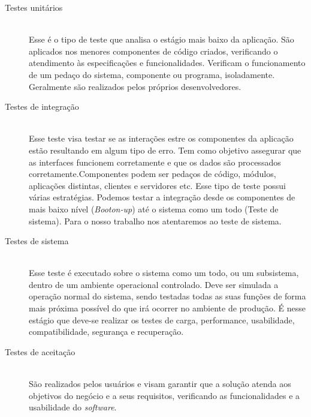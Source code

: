 \begin{description}
\item[Testes unitários] \hfill \\

Esse é o tipo de teste que analisa o estágio mais baixo da aplicação. São aplicados nos menores componentes de código criados, verificando o atendimento às especificações e funcionalidades. Verificam o funcionamento de um pedaço do sistema, componente ou programa,  isoladamente. Geralmente são realizados pelos próprios desenvolvedores.

\item[Testes de integração] \hfill \\

Esse teste visa testar se as interações estre os componentes da aplicação estão resultando em algum tipo de erro. Tem como objetivo assegurar que as interfaces funcionem corretamente e que os dados são processados corretamente.Componentes podem ser pedaços de código, módulos, aplicações distintas, clientes e servidores etc. Esse tipo de teste possui várias estratégias. Podemos testar a integração desde os componentes de mais baixo nível (\textit{Booton-up})  até o sistema como um todo (Teste de sistema). Para o nosso trabalho nos atentaremos ao teste de sistema.

\item[Testes de sistema] \hfill \\

Esse teste é executado sobre o sistema como um todo, ou um subsistema, dentro de um ambiente operacional controlado. Deve ser simulada a operação normal do sistema, sendo testadas todas as suas funções de forma mais próxima possível do que irá ocorrer no ambiente de produção. É nesse estágio que deve-se realizar os testes de carga, performance, usabilidade, compatibilidade, segurança e recuperação.

\item[Testes de aceitação] \hfill \\

São realizados pelos usuários e visam garantir que a solução atenda aos objetivos do negócio e a seus requisitos, verificando as funcionalidades e a usabilidade do \textit{software}.
\end{description}

